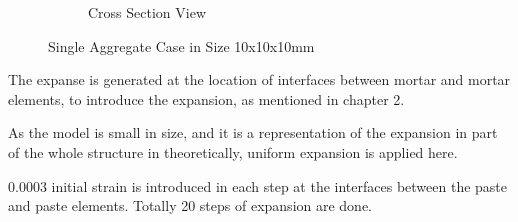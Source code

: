 \begin{figure}[h!]
\begin{subfigure}{.25\textwidth}
\caption{Cross Section View}
\end{subfigure}%
\caption{Single Aggregate Case in Size 10x10x10mm}
\end{figure}


The expanse is generated at the location of interfaces between mortar and mortar elements, to introduce the expansion, as mentioned in chapter 2.

As the model is small in size, and it is a representation of the expansion in part of the whole structure in theoretically, uniform expansion is applied here.


0.0003 initial strain is introduced in each step at the interfaces between the paste and paste elements. Totally 20 steps of expansion are done.

